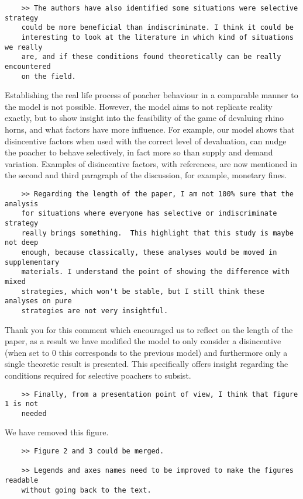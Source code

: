 \documentclass[10pt]{article}
\begin{document}
\begin{verbatim}
    >> The authors have also identified some situations were selective strategy
    could be more beneficial than indiscriminate. I think it could be
    interesting to look at the literature in which kind of situations we really
    are, and if these conditions found theoretically can be really encountered
    on the field.
\end{verbatim}

Establishing the real life process of poacher behaviour in a comparable manner to the
model is not possible. However, the model aims to not replicate reality exactly, but
to show insight into the feasibility of the game of devaluing rhino horns, and what
factors have more influence. For example, our model shows that disincentive factors
when used with the correct level of devaluation,
can nudge the poacher to behave selectively, in fact more so than supply and demand
variation. Examples of disincentive factors, with references, are now mentioned in
the second and third paragraph of the discussion, for example, monetary fines.

\begin{verbatim}
    >> Regarding the length of the paper, I am not 100% sure that the analysis
    for situations where everyone has selective or indiscriminate strategy
    really brings something.  This highlight that this study is maybe not deep
    enough, because classically, these analyses would be moved in supplementary
    materials. I understand the point of showing the difference with mixed
    strategies, which won't be stable, but I still think these analyses on pure
    strategies are not very insightful.
\end{verbatim}

Thank you for this comment which encouraged us to reflect on the length of the
paper, as a result we have modified the model to only consider a disincentive
(when set to \(0\) this corresponds to the previous model) and furthermore only
a single theoretic result is presented. This specifically offers insight
regarding the conditions required for selective poachers to subsist.

\begin{verbatim}
    >> Finally, from a presentation point of view, I think that figure 1 is not
    needed
\end{verbatim}

We have removed this figure.

\begin{verbatim}
    >> Figure 2 and 3 could be merged.

    >> Legends and axes names need to be improved to make the figures readable
    without going back to the text.
\end{verbatim}
\end{document}
